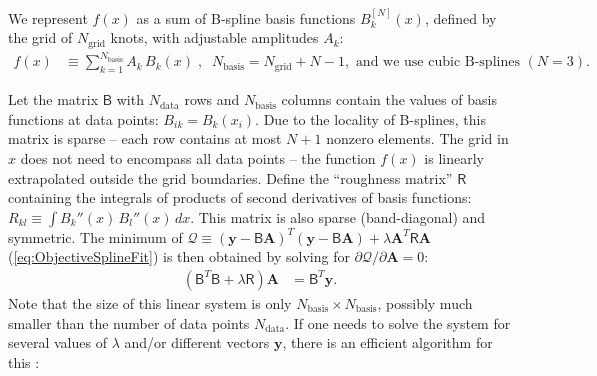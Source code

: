 \documentclass[12pt]{article}
\renewcommand{\d}{\partial}
\newcommand{\bA}{\boldsymbol{A}}
\newcommand{\by}{\boldsymbol{y}}
\begin{document}
We represent $f(x)$ as a sum of B-spline basis functions $B^{[N]}_k(x)$, defined by the grid of $N_\mathrm{grid}$ knots, with adjustable amplitudes $A_k$:
\begin{align}  \label{eq:FncSplineFit}
f(x) &\equiv \sum_{k=1}^{N_\mathrm{basis}} A_k\,B_k(x) \;,\;\;N_\mathrm{basis} = N_\mathrm{grid}+N-1, \mbox{ and we use cubic B-splines }(N=3).
\end{align}

Let the matrix $\mathsf{B}$ with $N_\mathrm{data}$ rows and $N_\mathrm{basis}$ columns contain the values of basis functions at data points: $B_{ik} = B_k(x_i)$. Due to the locality of B-splines, this matrix is sparse -- each row contains at most $N+1$ nonzero elements. The grid in $x$ does not need to encompass all data points -- the function $f(x)$ is linearly extrapolated outside the grid boundaries.
Define the ``roughness matrix'' $\mathsf{R}$ containing the integrals of products of second derivatives of basis functions: $R_{kl} \equiv \int B_k''(x) \, B_l''(x)\, dx$. This matrix is also sparse (band-diagonal) and symmetric.
The minimum of $\mathcal{Q}\equiv (\by - \mathsf{B} \bA)^{T} (\by - \mathsf{B} \bA) + \lambda 
\bA^T\mathsf{R} \bA$ (\ref{eq:ObjectiveSplineFit}) is then obtained by solving for $\d\mathcal{Q}/\d\bA=0$:
\begin{align}  \label{eq:SplineFitSol}
\left(\mathsf{B}^T\mathsf{B} + \lambda \mathsf{R} \right) \bA &= \mathsf{B}^T\by .
\end{align}
Note that the size of this linear system is only $N_\mathrm{basis}\times N_\mathrm{basis}$, possibly much smaller than the number of data points $N_\mathrm{data}$. If one needs to solve the system for several values of $\lambda$ and/or different vectors $\by$, there is an efficient algorithm for this \cite{RuppertWandCarroll}:
\end{document}
